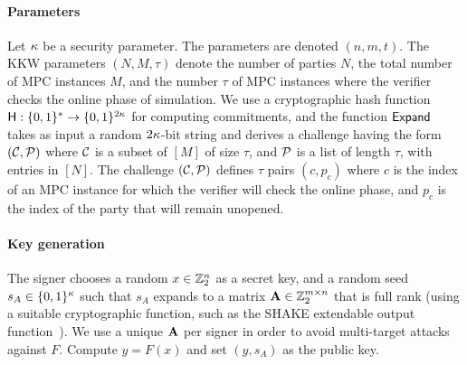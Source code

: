 \paragraph{Parameters} Let $\kappa$ be a security parameter.  The
\ttOWF parameters are denoted $(n, m, t)$.  The KKW parameters $(N, M,
\tau)$ denote the number of parties $N$, the total number of MPC instances $M$,
and the number $\tau$ of MPC instances where the verifier checks the online
phase of simulation. 
We use a cryptographic hash function $\textsf{H}: \{0,1\}^*\to \{0,1\}^{2\kappa}$
for computing commitments, and the function $\textsf{Expand}$ takes as input a random $2\kappa$-bit string
and derives a challenge having the form $(\mathcal{C}, \mathcal{P})$ where $\mathcal{C}$ is a subset of $[M]$
of size $\tau$, and $\mathcal{P}$ is a list of length $\tau$, with entries in $[N]$. 
The challenge $(\mathcal{C}, \mathcal{P})$ defines $\tau$ pairs $(c,p_c)$ where $c$ is the
index of  an MPC instance for which the verifier will check the online phase,
and $p_c$ is the index of the party that will remain unopened. 

\paragraph{Key generation} The signer chooses a random $x \in \mathbb{Z}_2^n$ as a
secret key, and a random seed $s_A \in \{0,1\}^{\kappa}$ such that $s_A$
expands to a matrix $\mathbf{A} \in \mathbb{Z}_2^{m\times n}$ that is full rank (using a suitable cryptographic
function, such as the SHAKE extendable output function~\cite{sp800-185}).  We
use a unique $\mathbf{A}$ per signer in order to avoid multi-target attacks against $F$.
Compute $y = F(x)$ and set $(y, s_A)$ as the public key.  

